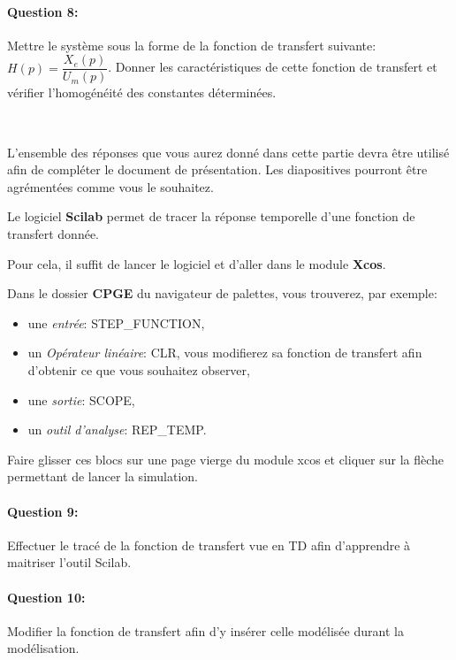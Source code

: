 \paragraph{Question 8:} Mettre le système sous la forme de la fonction de transfert suivante: $H(p)=\dfrac{X_e(p)}{U_m(p)}$. Donner les caractéristiques de cette fonction de transfert et vérifier l'homogénéité des constantes déterminées.

~\

L'ensemble des réponses que vous aurez donné dans cette partie devra être utilisé afin de compléter le document de présentation. Les diapositives pourront être agrémentées comme vous le souhaitez.

\ifdef{\public}{\cleardoublepage}{\newpage}


Le logiciel \textbf{Scilab} permet de tracer la réponse temporelle d'une fonction de transfert donnée.

Pour cela, il suffit de lancer le logiciel et d'aller dans le module \textbf{Xcos}.

Dans le dossier \textbf{CPGE} du navigateur de palettes, vous trouverez, par exemple:
\begin{itemize}
 \item une \textit{entrée}: STEP\_FUNCTION,
 \item un \textit{Opérateur linéaire}: CLR, vous modifierez sa fonction de transfert afin d'obtenir ce que vous souhaitez observer,
 \item une \textit{sortie}: SCOPE,
 \item un \textit{outil d'analyse}: REP\_TEMP.
\end{itemize}

Faire glisser ces blocs sur une page vierge du module xcos et cliquer sur la flèche permettant de lancer la simulation.

\paragraph{Question 9:} Effectuer le tracé de la fonction de transfert vue en TD afin d'apprendre à maitriser l'outil Scilab.

\paragraph{Question 10:} Modifier la fonction de transfert afin d'y insérer celle modélisée durant la modélisation.

